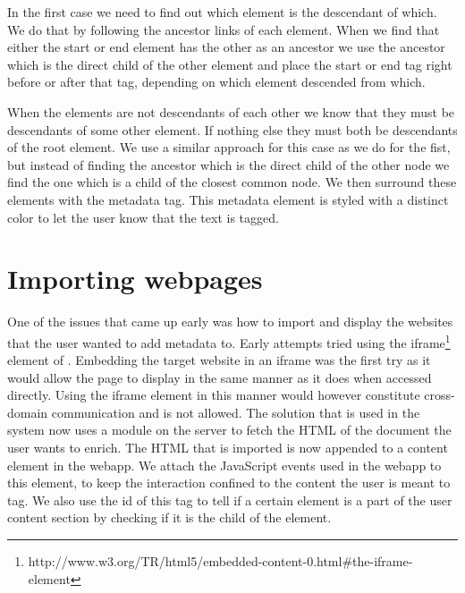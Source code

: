 In the first case we need to find out which element is the descendant of which.
We do that by following the ancestor links of each element.
When we find that either the start or end element has the other as an ancestor we use the ancestor which is the direct
child of the other element and place the start or end tag right before or after that tag, depending on which element
descended from which.

When the elements are not descendants of each other we know that they must be descendants of some other element.
If nothing else they must both be descendants of the root element.
We use a similar approach for this case as we do for the fist,
but instead of finding the ancestor which is the direct child of the other node we find the one which is a child of the
closest common node.
We then surround these elements with the metadata tag.
This metadata element is styled with a distinct color to let the user know that the text is tagged.

\section{Importing webpages}
One of the issues that came up early was how to import and display the websites that the user wanted to add metadata to.
Early attempts tried using the iframe\footnote{http://www.w3.org/TR/html5/embedded-content-0.html\#the-iframe-element}
element of .
Embedding the target website in an iframe was the first try as it would allow the page to display in the same manner
as it does when accessed directly.
Using the iframe element in this manner would however constitute cross-domain communication and is not allowed.
The solution that is used in the system now uses a module on the server to fetch the HTML of the document the user wants to enrich.
The HTML that is imported is now appended to a content element in the webapp.
We attach the JavaScript events used in the webapp to this element,
to keep the interaction confined to the content the user is meant to tag.
We also use the id of this tag to tell if a certain element is a part of the user content section by checking if it is
the child of the element.

